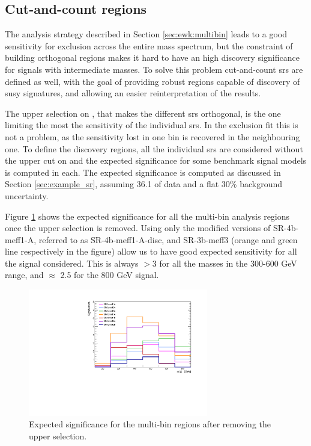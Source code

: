 \subsection{Cut-and-count regions}

The analysis strategy described in Section \ref{sec:ewk:multibin} leads to a good sensitivity for exclusion across the entire mass spectrum, 
but the constraint of building orthogonal regions makes it hard to have an high discovery significance 
for signals with intermediate masses. 
To solve this problem cut-and-count \glspl{sr} are defined as well, with the goal of
providing robust regions capable of discovery of \gls{susy} signatures, 
and allowing an easier reinterpretation of the results.

The upper selection on \meffb, that makes the different \glspl{sr} orthogonal, 
is the one limiting the most the sensitivity of the individual \glspl{sr}.
In the exclusion fit this is not a problem, as the sensitivity lost in one bin is recovered in the neighbouring one. 
To define the discovery regions, all the individual \glspl{sr} are considered without the upper cut on \meffb
and the expected significance for some benchmark signal models is computed in each. 
The expected significance is computed as discussed in Section \ref{sec:example_sr}, 
assuming 36.1 \ifb of data and a flat 30\% background uncertainty. 

Figure \ref{fig:ewk:disc_sig} shows the expected significance for all the multi-bin analysis regions once the upper \meffb 
selection is removed. 
Using only the modified versions of SR-4b-meff1-A, referred to as SR-4b-meff1-A-disc, 
and SR-3b-meff3 (orange and green line respectively in the figure) allow us to have good expected sensitivity for 
all the signal considered.  
This is always $>$3 for all the masses in the 300-600 GeV range, and $\approx$ 2.5 for the 800 GeV signal. 

\begin{figure}[htbp]
\centering
\includegraphics[width=0.7\textwidth]{figures/ewk_prod/discovery/significances_hh_regions.pdf}
\caption{Expected significance for the multi-bin regions after removing the upper \meffb selection. 
\label{fig:ewk:disc_sig}
}
\end{figure}


